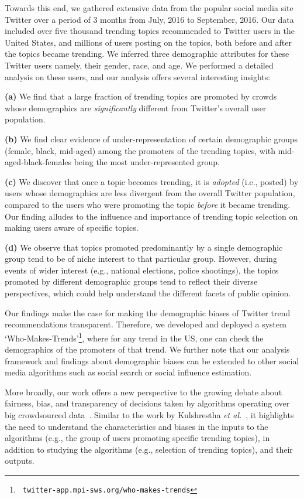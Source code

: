 \documentclass[letterpaper]{article}
\begin{document}
Towards this end, we gathered extensive data from
the popular social media site Twitter over a period of 3 months from
July, 2016 to September, 2016. Our data included over five thousand
trending topics recommended to Twitter users in the United States, and
millions of users posting on the topics, both before and after the
topics became trending. We inferred three demographic attributes for
these Twitter users namely, their gender, race, and age.
We performed a detailed analysis on these users, and our
analysis offers several interesting insights:

{\bf (a)} We find that a large fraction of trending topics are
promoted by crowds whose demographics are {\it significantly}
different from Twitter's overall user population.

{\bf (b)} We find clear evidence of 
under-representation of certain demographic groups (female, black, mid-aged)
among the promoters of the trending topics, with 
mid-aged-black-females being the most under-represented group.

{\bf (c)} We discover that once a topic becomes trending, it is {\it
  adopted} (i.e., posted) by users whose demographics are less
divergent from the overall Twitter population, compared to the users
who were promoting the topic {\it before} it became trending.  Our
finding alludes to the influence and importance of trending topic
selection on making users aware of specific topics.

{\bf (d)} We observe that topics promoted predominantly by a single
demographic group tend to be of niche interest to that particular
group.  However, during events of wider interest (e.g., national
elections, police shootings), 
the topics promoted by different demographic groups tend to reflect
their diverse perspectives, which could help understand the different
facets of public opinion.

Our findings make the case for making the demographic biases of
Twitter trend recommendations transparent. Therefore, 
we developed and deployed a system `Who-Makes-Trends'\footnote{\tt 
twitter-app.mpi-sws.org/who-makes-trends}, where for any trend in
the US, one can check the demographics of the promoters of that trend.
We further note that our analysis framework and findings about demographic
biases can be extended to other social media algorithms such as social
search or social influence estimation.

More broadly, our work offers a new perspective to the growing debate
about fairness, bias, and transparency of decisions taken by
algorithms operating over big crowdsourced data~\cite{zafar2015learning,chakraborty2016dissemination,kroll2015accountable}.
Similar to the work by Kulshrestha {\it et al.}~\cite{Kulshrestha2017}, 
it highlights the need to understand the characteristics and biases in the 
inputs to the algorithms (e.g., the group of users promoting specific trending topics), in addition to
studying the algorithms (e.g., selection of trending topics), and
their outputs. 
\end{document}
